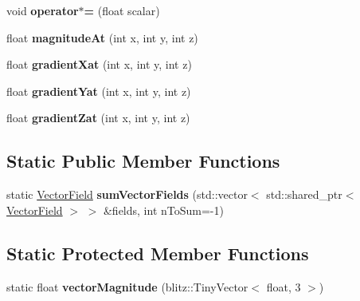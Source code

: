 \begin{DoxyCompactItemize}
\item 
\hypertarget{classVectorField_a3d39045dddd9bfbf90dbe9ab76f904b0}{void {\bfseries operator$\ast$=} (float scalar)}\label{classVectorField_a3d39045dddd9bfbf90dbe9ab76f904b0}

\item 
\hypertarget{classVectorField_a3cb694666f5becb9ea226f6cd3ca7b45}{float {\bfseries magnitude\+At} (int x, int y, int z)}\label{classVectorField_a3cb694666f5becb9ea226f6cd3ca7b45}

\item 
\hypertarget{classVectorField_a2dbaf6020fae95e9db0b8c41444d0c80}{float {\bfseries gradient\+Xat} (int x, int y, int z)}\label{classVectorField_a2dbaf6020fae95e9db0b8c41444d0c80}

\item 
\hypertarget{classVectorField_a5dfbcf9cb3d92bfe58592eedf93e4a9b}{float {\bfseries gradient\+Yat} (int x, int y, int z)}\label{classVectorField_a5dfbcf9cb3d92bfe58592eedf93e4a9b}

\item 
\hypertarget{classVectorField_a116993b0bfe35958e03720a3205dcd82}{float {\bfseries gradient\+Zat} (int x, int y, int z)}\label{classVectorField_a116993b0bfe35958e03720a3205dcd82}

\end{DoxyCompactItemize}
\subsection*{Static Public Member Functions}
\begin{DoxyCompactItemize}
\item 
\hypertarget{classVectorField_a30d32c9496ed177e1545b32b9b1970ac}{static \hyperlink{classVectorField}{Vector\+Field} {\bfseries sum\+Vector\+Fields} (std\+::vector$<$ std\+::shared\+\_\+ptr$<$ \hyperlink{classVectorField}{Vector\+Field} $>$ $>$ \&fields, int n\+To\+Sum=-\/1)}\label{classVectorField_a30d32c9496ed177e1545b32b9b1970ac}

\end{DoxyCompactItemize}
\subsection*{Static Protected Member Functions}
\begin{DoxyCompactItemize}
\item 
\hypertarget{classVectorField_ab5a583d5c261ccd4fffc1fb6ce687c9d}{static float {\bfseries vector\+Magnitude} (blitz\+::\+Tiny\+Vector$<$ float, 3 $>$)}\label{classVectorField_ab5a583d5c261ccd4fffc1fb6ce687c9d}

\end{DoxyCompactItemize}
